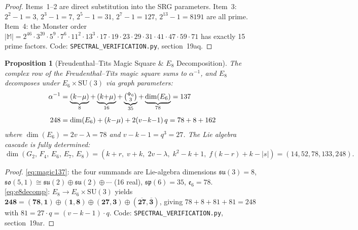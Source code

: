 \documentclass[12pt,a4paper]{article}
\newtheorem{proposition}[theorem]{Proposition}
\begin{document}
\begin{proof}
Items~1--2 are direct substitution into the SRG parameters.
Item~3: $2^2 - 1 = 3$, $2^3 - 1 = 7$, $2^5 - 1 = 31$,
$2^7 - 1 = 127$, $2^{13} - 1 = 8191$ are all prime.
Item~4: the Monster order $|\mathbb{M}| = 2^{46}\cdot 3^{20}\cdot
5^9\cdot 7^6\cdot 11^2\cdot 13^3\cdot 17\cdot 19\cdot 23\cdot 29
\cdot 31\cdot 41\cdot 47\cdot 59\cdot 71$ has exactly 15 prime factors.
Code: \texttt{SPECTRAL\_VERIFICATION.py}, section~19aq.
\end{proof}

\begin{proposition}[Freudenthal--Tits Magic Square \& $E_8$ Decomposition]
\label{prop:magic-square}
The complex row of the Freudenthal--Tits magic square sums to $\alpha^{-1}$,
and $E_8$ decomposes under $E_6 \times \mathrm{SU}(3)$ via graph parameters:
\begin{align}
  \alpha^{-1} &= \underbrace{(k{-}\mu)}_{8}
    + \underbrace{(k{+}\mu)}_{16}
    + \underbrace{\tbinom{\Phi_6}{3}}_{35}
    + \underbrace{\dim(E_6)}_{78}
    = 137 \label{eq:magic137} \\[4pt]
  248 &= \dim(E_6) + (k{-}\mu) + 2(v{-}k{-}1)\,q
    = 78 + 8 + 162 \label{eq:e8decomp}
\end{align}
where $\dim(E_6) = 2v - \lambda = 78$ and $v - k - 1 = q^3 = 27$.
The Lie algebra cascade is fully determined:
\[
  \dim(G_2,\,F_4,\,E_6,\,E_7,\,E_8)
  = (k{+}r,\; v{+}k,\; 2v{-}\lambda,\; k^2{-}k{+}1,\; f(k{-}r){+}k{-}|s|)
  = (14,52,78,133,248).
\]
\end{proposition}

\begin{proof}
\eqref{eq:magic137}: the four summands are Lie-algebra dimensions
$\mathfrak{su}(3)=8$, $\mathfrak{so}(5,1)\cong\mathfrak{su}(2)\oplus
\mathfrak{su}(2)\oplus\cdots$ (16 real), $\mathfrak{sp}(6)=35$,
$\mathfrak{e}_6=78$.
\eqref{eq:e8decomp}: $E_8\to E_6\times\mathrm{SU}(3)$ yields
$\mathbf{248}=(\mathbf{78},\mathbf{1})\oplus(\mathbf{1},\mathbf{8})
\oplus(\mathbf{27},\mathbf{3})\oplus(\overline{\mathbf{27}},
\overline{\mathbf{3}})$, giving $78+8+81+81=248$ with
$81=27\cdot q = (v{-}k{-}1)\cdot q$.
Code: \texttt{SPECTRAL\_VERIFICATION.py}, section~19ar.
\end{proof}
\end{document}
